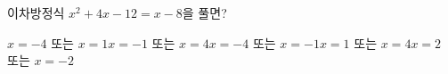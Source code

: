 이차방정식 $x^2+4x-12=x-8$을 풀면?
\begin{choicesii}{$x=-4$ 또는 $x=1$}{$x=-1$ 또는 $x=4$}{$x=-4$ 또는 $x=-1$}{$x=1$ 또는 $x=4$}{$x=2$ 또는 $x=-2$}\end{choicesii}
